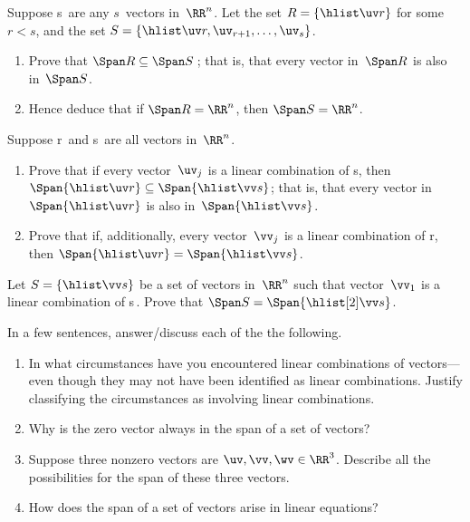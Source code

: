 \begin{exercise} \label{ex:} 
Suppose \hlist\uv s\ are any \(s\)~vectors in~\(\RR^n\).
Let the set \(R=\{\hlist\uv r\}\) for some \(r<s\), and the set \(S=\{\hlist\uv r,\uv_{r+1},\ldots,\uv_s\}\).
\begin{enumerate}
\item Prove that \(\Span R\subseteq\Span S\)\,; that is, that every vector in~\(\Span R\) is also in~\(\Span S\).
\item Hence deduce that if \(\Span R=\RR^n\), then \(\Span S=\RR^n\).
\end{enumerate}
\end{exercise}




\begin{exercise} \label{ex:} 
Suppose \hlist\uv r\ and \hlist\vv s\ are all vectors in~\(\RR^n\).
\begin{enumerate}
\item Prove that if every vector~\(\uv_j\) is a linear combination of \hlist\vv s, then \(\Span\{\hlist\uv r\}\subseteq\Span\{\hlist\vv s\}\); that is, that every vector in~\(\Span\{\hlist\uv r\}\) is also in~\(\Span\{\hlist\vv s\}\).
\item  Prove that if, additionally, every vector~\(\vv_j\) is a linear combination of \hlist\uv r, then \(\Span\{\hlist\uv r\}=\Span\{\hlist\vv s\}\).
\end{enumerate}
\end{exercise}





\begin{exercise} \label{ex:} 
Let \(S=\{\hlist\vv s\}\) be a set of vectors in~\(\RR^n\) such that vector~\(\vv_1\) is a linear combination of \hlist[2]\vv s\,.  
Prove that \(\Span S=\Span\{\hlist[2]\vv s\}\).
\end{exercise}







\begin{exercise} \label{ex:} 
In a few sentences, answer\slash discuss each of the the following.
\begin{enumerate}
\item In what circumstances have you encountered linear combinations of vectors---even though they may not have been identified as linear combinations.
Justify classifying the circumstances as involving linear combinations. 

\item Why is the zero vector always in the span of a set of vectors?

\item Suppose three nonzero vectors are \(\uv,\vv,\wv\in\RR^3\).  
Describe all the possibilities for the span of these three vectors.

\item How does the span of a set of vectors arise in linear equations?

\end{enumerate}
\end{exercise}

\begin{comment}%
why, what caused X?
how did X occur?
what-if? what-if-not?
how does X compare with Y?
what is the evidence for X?
why is X important?
\end{comment}
